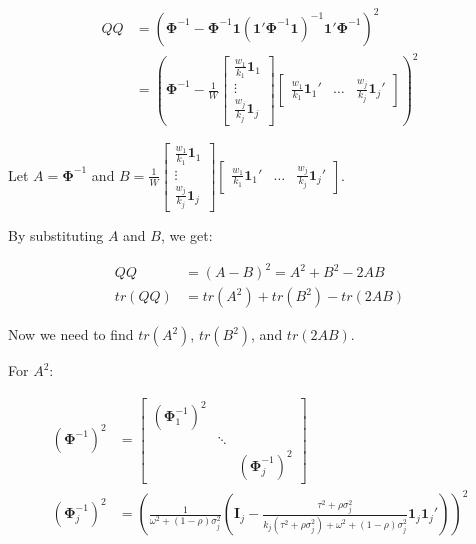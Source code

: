 \begin{equation}
    \begin{split}
       QQ & = (\mathbf{\Phi}^{-1} - \mathbf{\Phi}^{-1}\mathbf{1}(\mathbf{1}'\mathbf{\Phi}^{-1}\mathbf{1})^{-1}\mathbf{1}'\mathbf{\Phi}^{-1})^2 \\
       & = \left(\mathbf{\Phi}^{-1} - \frac{1}{W} 
       \begin{bmatrix} 
       \frac{w_1}{k_1}\mathbf{1}_1 \\
       \vdots \\
       \frac{w_j}{k_j}\mathbf{1}_j
       \end{bmatrix} \begin{bmatrix}
           \frac{w_1}{k_1}\mathbf{1}_1' & \dots & \frac{w_j}{k_j}\mathbf{1}_j'
       \end{bmatrix}  \right)^2
    \end{split}
    \nonumber
\end{equation}

Let $A = \mathbf{\Phi}^{-1}$ and $B = \frac{1}{W} 
       \begin{bmatrix} 
       \frac{w_1}{k_1}\mathbf{1}_1 \\
       \vdots \\
       \frac{w_j}{k_j}\mathbf{1}_j
       \end{bmatrix} \begin{bmatrix}
           \frac{w_1}{k_1}\mathbf{1}_1' & \dots & \frac{w_j}{k_j}\mathbf{1}_j'
       \end{bmatrix}$.

By substituting $A$ and $B$, we get:

\begin{equation}
    \begin{split}
        QQ & = (A - B)^2 = A^2 + B^2 - 2AB \\
        tr(QQ) & = tr(A^2) + tr(B^2) - tr(2AB)
    \end{split}   
     \nonumber
\end{equation}

Now we need to find $tr(A^2)$, $ tr(B^2)$, and $tr(2AB)$.

For $A^2$:


\begin{equation}
    \begin{split}
        (\mathbf{\Phi}^{-1})^2 & = \begin{bmatrix}
        (\mathbf{\Phi}_1^{-1})^2 & &  \\
        & \ddots &  \\
        & & (\mathbf{\Phi}_j^{-1})^2 
    \end{bmatrix} \\
       (\mathbf{\Phi}_j^{-1})^2  & = \left( \frac{1}{\omega^2 + (1-\rho) \sigma^2_j} \left(\mathbf{I}_j - \frac{\tau^2 +\rho\sigma_j^2}{k_j(\tau^2 + \rho\sigma^2_j)+\omega^2+(1-\rho)\sigma_j^2} \mathbf{1}_j \mathbf{1}_j'  \right) \right)^2 
    \end{split}
     \nonumber
\end{equation}


